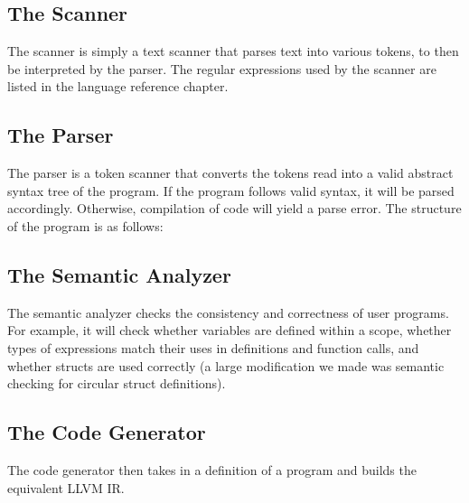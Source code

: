 	\subsection{The Scanner}
    The scanner is simply a text scanner that parses text into various tokens, to then be interpreted by the parser. The regular expressions used by the scanner are listed in the language reference chapter.

	\subsection{The Parser}
    The parser is a token scanner that converts the tokens read into a valid abstract syntax tree of the program. If the program follows valid syntax, it will be parsed accordingly. Otherwise, compilation of code will yield a parse error. The structure of the program is as follows:

	\subsection{The Semantic Analyzer}
	The semantic analyzer checks the consistency and correctness of user programs. For example, it will check whether variables are defined within a scope, whether types of expressions match their uses in definitions and function calls, and whether structs are used correctly (a large modification we made was semantic checking for circular struct definitions).  

	\subsection{The Code Generator}
	The code generator then takes in a definition of a program and builds the equivalent LLVM IR. 